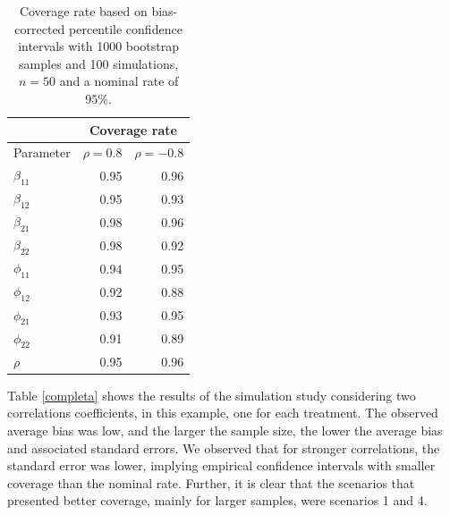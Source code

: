 \documentclass[useAMS,referee]{biom}
\begin{document}
\begin{table}[h]
\caption{Coverage rate based on  bias-corrected percentile confidence intervals with 1000 bootstrap samples and 100 simulations, $n=50$ and a nominal rate of $95\%$.}
\label{table5.4}
\begin{center}
\begin{tabular}{lrr}
	\hline
	& \multicolumn{2}{c}{Coverage rate} \\
	\hline
	Parameter	& $\rho=0.8$ & $\rho=-0.8$ \\ \hline
	$\beta_{11}$ & 0.95 & 0.96\\ 
	$\beta_{12}$ &  0.95 & 0.93 \\
	
	$\beta_{21}$& 0.98 & 0.96 \\
	
	$\beta_{22}$& 0.98 & 0.92 \\
	
	$\phi_{11}$& 0.94 & 0.95 \\ 
	$\phi_{12}$&  0.92  & 0.88\\
	$\phi_{21}$&  0.93 & 0.95 \\ 
	$\phi_{22}$& 0.91 &0.89 \\
	$\rho$ & 0.95 & 0.96\\
	\hline
\end{tabular}
\end{center}
\end{table}


Table \ref{completa} shows the results of the simulation study considering two correlations coefficients, in this example, one for each treatment.  The observed average bias was low, and the larger the sample size, the lower the average bias and associated standard errors. We observed that for stronger correlations, the standard error was lower, implying empirical confidence intervals with smaller coverage than the nominal rate. Further, it is clear that the scenarios that presented better coverage, mainly for larger samples, were scenarios 1 and 4.
\end{document}
